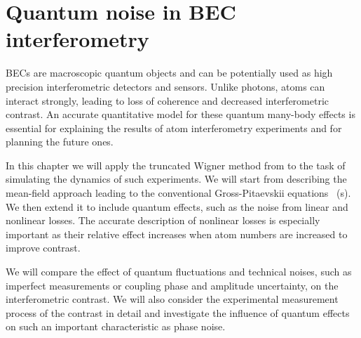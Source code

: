 \chapter{Quantum noise in BEC interferometry}
\label{cha:bec-noise}

BECs are macroscopic quantum objects and can be potentially used as high precision interferometric detectors and sensors.
Unlike photons, atoms can interact strongly, leading to loss of coherence and decreased interferometric contrast.
An accurate quantitative model for these quantum many-body effects is essential for explaining the results of atom interferometry experiments and for planning the future ones.

In this chapter we will apply the truncated Wigner method from  to the task of simulating the dynamics of such experiments.
We will start from describing the mean-field approach leading to the conventional Gross-Pitaevskii equations~\cite{Pitaevskii2003} (s).
We then extend it to include quantum effects, such as the noise from linear and nonlinear losses.
The accurate description of nonlinear losses is especially important as their relative effect increases when atom numbers are increased to improve contrast.

We will compare the effect of quantum fluctuations and technical noises, such as imperfect measurements or coupling phase and amplitude uncertainty, on the interferometric contrast.
We will also consider the experimental measurement process of the contrast in detail and investigate the influence of quantum effects on such an important characteristic as phase noise.







